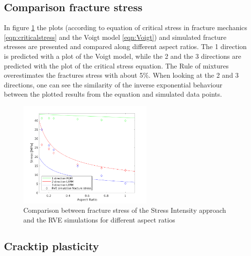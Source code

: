 \subsection{Comparison fracture stress}
In figure \ref{fig:fracturestress} the plots (according to equation of critical stress in fracture mechanics \ref{eqn:criticalstress} and the Voigt model \ref{eqn:Voigt}) and simulated fracture stresses are presented and compared along different aspect ratios. The 1 direction is predicted with a plot of the Voigt model, while the 2 and the 3 directions are predicted with the plot of the critical stress equation. The Rule of mixtures overestimates the fractures stress with about 5\%. 
When looking at the 2 and 3 directions, one can see the similarity of the inverse exponential behaviour between the plotted results from the equation and simulated data points. 


\begin{figure}[H]
    \centering
    \includegraphics[width=0.60\textwidth]{chapter_7_non-elasticmodelling/figures/yieldstress.png}
    \caption{Comparison between fracture stress of the Stress Intensity approach and the RVE simulations for different aspect ratios}
    \label{fig:fracturestress}
\end{figure}
\subsection{Cracktip plasticity}

